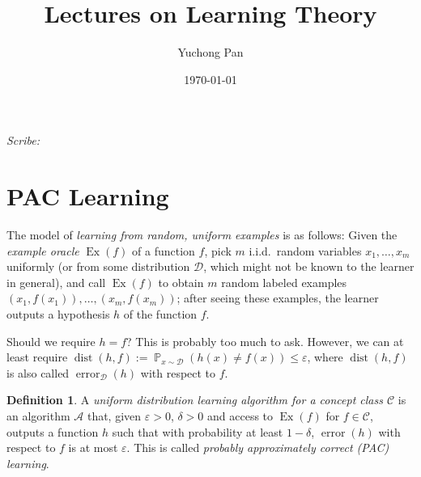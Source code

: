 \documentclass[letterpaper, reqno,11pt]{article}
\newcommand{\PP}{\mathop{{}\mathbb{P}}}
\DeclareMathOperator{\dist}{dist}
\DeclareMathOperator{\Ex}{Ex}
\DeclareMathOperator{\error}{error}
\begin{document}
\title{Lectures on Learning Theory}
\author{Yuchong Pan}
\date{\today}
\newtheorem{theorem}{Theorem}
\newtheorem{lemma}[theorem]{Lemma}
\newtheorem{proposition}[theorem]{Proposition}
\newtheorem{corollary}[theorem]{Corollary}
\newtheorem{fact}[theorem]{Fact}
\newtheorem{problem}[theorem]{Problem}
\newtheorem{observation}[theorem]{Observation}
\newtheorem{claim}{Claim}
\newtheorem{exercise}{Exercise}
\theoremstyle{definition}
\newtheorem{definition}[theorem]{Definition}
%

\begin{framed}
 \hfill \thedate
\begin{center}
\Large{\thetitle}
\end{center}
 \hfill {\em Scribe: \theauthor}
\end{framed}

\section{PAC Learning}

The model of \emph{learning from random, uniform examples} is as follows: Given the \emph{example oracle} $\Ex(f)$ of a function $f$, pick $m$ i.i.d.\ random variables $x_1, \ldots, x_m$ uniformly (or from some distribution $\mathcal D$, which might not be known to the learner in general), and call $\Ex(f)$ to obtain $m$ random labeled examples $(x_1, f(x_1)), \ldots, (x_m, f(x_m))$; after seeing these examples, the learner outputs a hypothesis $h$ of the function $f$.

Should we require $h = f$? This is probably too much to ask. However, we can at least require $\dist(h, f) := \PP_{x \sim \mathcal D}(h(x) \neq f(x)) \leq \varepsilon$, where $\dist(h, f)$ is also called $\error_{\mathcal D}(h)$ with respect to $f$.

\begin{definition}
  A \emph{uniform distribution learning algorithm for a concept class $\mathcal C$} is an algorithm $\mathcal A$ that, given $\varepsilon > 0$, $\delta > 0$ and access to $\Ex(f)$ for $f \in \mathcal C$, outputs a function $h$ such that with probability at least $1 - \delta$, $\error(h)$ with respect to $f$ is at most $\varepsilon$. This is called \emph{probably approximately correct (PAC) learning}.
\end{definition}
\end{document}
